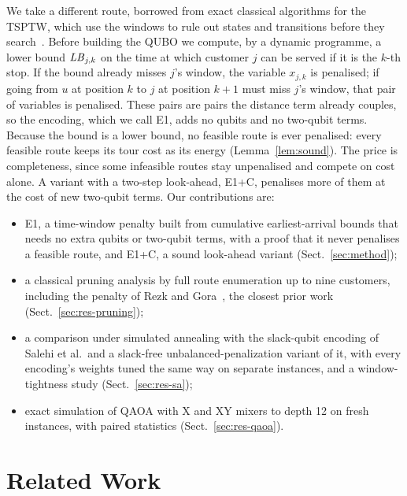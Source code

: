 We take a different route, borrowed from exact classical algorithms for the TSPTW, which use
the windows to rule out states and transitions before they search~\cite{dumas1995optimal}.
Before building the QUBO we compute, by a dynamic programme, a lower bound $\mathit{LB}_{j,k}$ on the
time at which customer $j$ can be served if it is the $k$-th stop. If the bound already misses
$j$'s window, the variable $x_{j,k}$ is penalised; if going from $u$ at position $k$ to $j$ at
position $k+1$ must miss $j$'s window, that pair of variables is penalised. These pairs are
pairs the distance term already couples, so the encoding, which we call E1, adds no qubits and
no two-qubit terms. Because the bound is a lower bound, no feasible route is ever penalised:
every feasible route keeps its tour cost as its energy (Lemma~\ref{lem:sound}). The price is
completeness, since some infeasible routes stay unpenalised and compete on cost alone. A
variant with a two-step look-ahead, E1+C, penalises more of them at the cost of new two-qubit
terms. Our contributions are:
\begin{itemize}
  \item E1, a time-window penalty built from cumulative earliest-arrival bounds that needs no
        extra qubits or two-qubit terms, with a proof that it never penalises a feasible route,
        and E1+C, a sound look-ahead variant (Sect.~\ref{sec:method});
  \item a classical pruning analysis by full route enumeration up to nine customers, including
        the penalty of Rezk and Gora~\cite{rezk2026gnn}, the closest prior work
        (Sect.~\ref{sec:res-pruning});
  \item a comparison under simulated annealing with the slack-qubit encoding of Salehi et al.\ and
        a slack-free unbalanced-penalization variant of it, with every encoding's weights
        tuned the same way on separate instances, and a window-tightness study
        (Sect.~\ref{sec:res-sa});
  \item exact simulation of QAOA with X and XY mixers to depth 12 on fresh instances, with
        paired statistics (Sect.~\ref{sec:res-qaoa}).
\end{itemize}

\section{Related Work}\label{sec:related}

